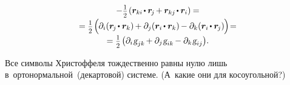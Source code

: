 \begin{otherlanguage}{russian}
\begin{multline}
- \smalldisplaystyleonehalf \hspace{-0.2ex} \left( \scalebox{0.96}[1]{$\bm{r}_{ki} \hspace{-0.2ex} \dotp \bm{r}_{\hspace{-0.2ex}j} \hspace{-0.16ex} + \bm{r}_{kj} \hspace{-0.2ex} \dotp \bm{r}_i$} \right) \hspace{-0.1ex} = \\[-0.25em]
%
= \smalldisplaystyleonehalf \hspace{-0.2ex} \left(^{\mathstrut} \hspace{-0.2ex}
\partial_i ( \bm{r}_{\hspace{-0.2ex}j} \hspace{-0.2ex} \dotp \bm{r}_k ) \hspace{-0.16ex}
+ \partial_j ( \bm{r}_{i} \hspace{-0.2ex} \dotp \bm{r}_k ) \hspace{-0.16ex}
- \partial_k ( \bm{r}_{i} \hspace{-0.2ex} \dotp \bm{r}_{\hspace{-0.2ex}j} )
\hspace{-0.12ex} \right) \hspace{-0.4ex} = \\[-0.25em]
%
= \smalldisplaystyleonehalf \hspace{-0.16ex} \left(
\partial_i \hspace{.12ex} \textsl{g}_{jk} \hspace{-0.2ex}
+ \partial_j \hspace{.1ex} \textsl{g}_{ik} \hspace{-0.2ex}
- \partial_k \hspace{.12ex} \textsl{g}_{ij}
\right) \hspace{-0.4ex} .
\end{multline}

Все символы Христоффеля тождественно равны нулю лишь в~ортонормальной~(декартовой) системе. (А~какие они для косоугольной?)


\end{otherlanguage}
